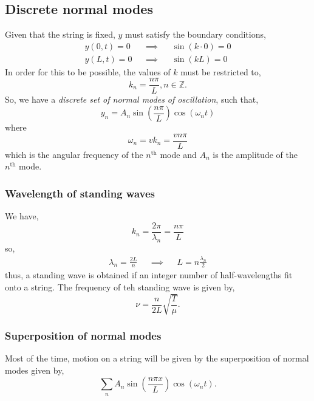 \documentclass{book}
\begin{document}
\subsection{Discrete normal modes}
Given that the string is fixed, $y$ must satisfy the boundary conditions, 
\begin{align}
	y(0, t) = 0 && \implies && \sin(k\cdot 0) = 0 \label{0cond} \\
	y(L,t) = 0 && \implies && \sin(kL) = 0 \label{lengthconditon}
\end{align}
In order for this to be possible, the values of $k$ must be restricted to,
\begin{equation}
	k_n = \frac{n\pi}{L}, n \in \mathbb{Z}.
\end{equation}
So, we have a \textit{discrete set of normal modes of oscillation}, such that, 
\begin{equation}
	y_n = A_n\sin\left(\frac{n\pi}{L}\right)\cos(\omega_nt)
\end{equation}
where 
\begin{equation}
	\omega_n = v k_n = \frac{vn\pi}{L}
\end{equation}
which is the angular frequency of the $n^{\text{th}}$ mode and $A_n$ is the amplitude of the $n^{\text{th}}$ mode.
\subsubsection{Wavelength of standing waves}
We have,
\begin{equation}
	k_n = \frac{2\pi}{\lambda_n} = \frac{n\pi}{L}
\end{equation}
so,
\begin{align}
	\lambda_n = \frac{2L}{n} && \implies && L = n\frac{\lambda_n}{2}
\end{align}
thus, a standing wave is obtained if an integer number of half-wavelengths fit onto a string. The frequency of teh standing wave is given by,
\begin{equation}
	\nu = \frac{n}{2L}\sqrt{\frac{T}{\mu}}.
\end{equation}
\subsubsection{Superposition of normal modes}
Most of the time, motion on a string will be given by the superposition of normal modes given by,
\begin{equation}
	\sum_n A_n\sin\left(\frac{n\pi x}{L}\right)\cos(\omega_n t).
\end{equation}
\end{document}
